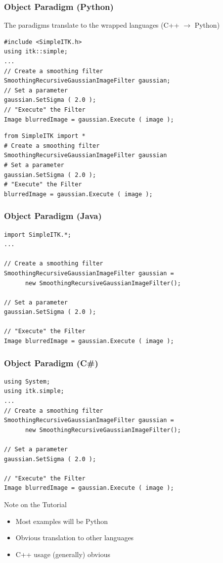 \begin{frame}[fragile]
\frametitle{Object Paradigm (Python)}
The paradigms translate to the wrapped languages (C++ $\rightarrow$ Python)
\lstcpp
\begin{lstlisting}
#include <SimpleITK.h>
using itk::simple;
...
// Create a smoothing filter
SmoothingRecursiveGaussianImageFilter gaussian;
// Set a parameter
gaussian.SetSigma ( 2.0 );
// "Execute" the Filter
Image blurredImage = gaussian.Execute ( image );
\end{lstlisting}
\lstpython
\begin{lstlisting}
from SimpleITK import *
# Create a smoothing filter
SmoothingRecursiveGaussianImageFilter gaussian
# Set a parameter
gaussian.SetSigma ( 2.0 );
# "Execute" the Filter
blurredImage = gaussian.Execute ( image );
\end{lstlisting}
\end{frame}

\begin{frame}[fragile]
\frametitle{Object Paradigm (Java)}
\lstjava
\begin{lstlisting}
import SimpleITK.*;
...

// Create a smoothing filter
SmoothingRecursiveGaussianImageFilter gaussian =
      new SmoothingRecursiveGaussianImageFilter();

// Set a parameter
gaussian.SetSigma ( 2.0 );

// "Execute" the Filter
Image blurredImage = gaussian.Execute ( image );
\end{lstlisting}
\end{frame}


\begin{frame}[fragile]
\frametitle{Object Paradigm (C\#)}
\lstjava
\begin{lstlisting}
using System;
using itk.simple;
...
// Create a smoothing filter
SmoothingRecursiveGaussianImageFilter gaussian =
      new SmoothingRecursiveGaussianImageFilter();

// Set a parameter
gaussian.SetSigma ( 2.0 );

// "Execute" the Filter
Image blurredImage = gaussian.Execute ( image );
\end{lstlisting}
\end{frame}


\begin{frame}{Note on the Tutorial}
\begin{itemize}
  \item Most examples will be Python
  \item Obvious translation to other languages
  \item C++ usage (generally) obvious
\end{itemize}
\end{frame}

